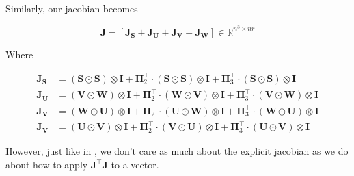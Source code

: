     Similarly, our jacobian becomes

    \begin{equation} \label{eq:ci_cp_dgn_jacobian}
        \mathbf{J} = [\mathbf{J}_\mathbf{S} + \mathbf{J}_\mathbf{U} + \mathbf{J}_\mathbf{V} + \mathbf{J}_\mathbf{W}] \in \mathbb{R}^{n^3\times nr}
    \end{equation}
    
    Where
    
    \begin{equation}
        \begin{array}{rcl}
                \mathbf{J}_\mathbf{S} & = \mathbf{(S\odot S)} \otimes \mathbf{I} + \mathbf{\Pi}_2^\intercal\cdot \mathbf{(S\odot S)} \otimes \mathbf{I} + \mathbf{\Pi}_3^\intercal\cdot \mathbf{(S\odot S)} \otimes \mathbf{I}\\
                \mathbf{J}_\mathbf{U} & = \mathbf{(V\odot W)} \otimes \mathbf{I} + \mathbf{\Pi}_2^\intercal\cdot \mathbf{(W\odot V)} \otimes \mathbf{I} + \mathbf{\Pi}_3^\intercal\cdot \mathbf{(V\odot W)} \otimes \mathbf{I}\\
                \mathbf{J}_\mathbf{V} & = \mathbf{(W\odot U)} \otimes \mathbf{I} + \mathbf{\Pi}_2^\intercal\cdot \mathbf{(U\odot W)} \otimes \mathbf{I} + \mathbf{\Pi}_3^\intercal\cdot \mathbf{(W\odot U)} \otimes \mathbf{I}\\
                \mathbf{J}_\mathbf{V} & = \mathbf{(U\odot V)} \otimes \mathbf{I} + \mathbf{\Pi}_2^\intercal\cdot \mathbf{(V\odot U)} \otimes \mathbf{I} + \mathbf{\Pi}_3^\intercal\cdot \mathbf{(U\odot V)} \otimes \mathbf{I}
        \end{array}
        \label{eq:ci_cp_dgn_jacobians}
    \end{equation}

    However, just like in , we don't care as much about the explicit jacobian as we do
    about how to apply $\mathbf{J^\intercal J}$ to a vector. 

